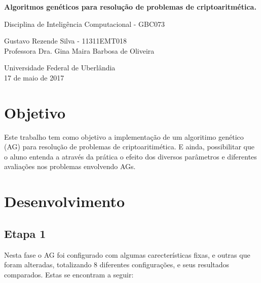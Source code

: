 \documentclass[a4paper, 12pt]{article}
\begin{document}
  \begin{center}
      \vspace*{0.2cm}

      \LARGE
      \textbf{Algoritmos genéticos para resolução de problemas de criptoaritmética.}

      \vspace{0.5cm}

      Disciplina de Inteligência Computacional - GBC073

      \vspace{6cm}

      \Large
      Gustavo Rezende Silva - 11311EMT018\\
      Professora Dra. Gina Maira Barbosa de Oliveira\\

      \vspace{7cm}



      \Large
      Universidade Federal de Uberlândia\\

      17 de maio de 2017

  \end{center}
  \newpage
    \tableofcontents

  \newpage

  \section{Objetivo}
  Este trabalho tem como objetivo a implementação de um algoritimo genético (AG) para
  resolução de problemas de criptoaritimética. E ainda, possibilitar que o aluno
  entenda a através da prática o efeito dos diversos parâmetros e diferentes
  avaliações nos problemas envolvendo AGs.


  \section{Desenvolvimento}

  \subsection{Etapa 1}
    Nesta fase o AG foi configurado com algumas carecterísticas fixas,
    e outras que foram alteradas, totalizando 8 diferentes configurações,
    e seus resultados comparados. Estas se encontram a seguir:
\end{document}
